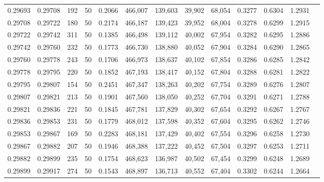 \begin{tabular}{rrrrrrrrrrrrr}
0.29693 & 0.29708 &   192 &  50 &                                     0.2066 & 466,007 & 139,603 &  39,902 &  68,054 & 0.3277 & 0.6304 & 1.2931 \\
0.29708 & 0.29722 &   180 &  50 &                                     0.2174 & 466,187 & 139,423 &  39,952 &  68,004 & 0.3278 & 0.6299 & 1.2915 \\
0.29722 & 0.29742 &   311 &  50 &                                     0.1385 & 466,498 & 139,112 &  40,002 &  67,954 & 0.3282 & 0.6295 & 1.2886 \\
0.29742 & 0.29760 &   232 &  50 &                                     0.1773 & 466,730 & 138,880 &  40,052 &  67,904 & 0.3284 & 0.6290 & 1.2865 \\
0.29760 & 0.29778 &   243 &  50 &                                     0.1706 & 466,973 & 138,637 &  40,102 &  67,854 & 0.3286 & 0.6285 & 1.2842 \\
0.29778 & 0.29795 &   220 &  50 &                                     0.1852 & 467,193 & 138,417 &  40,152 &  67,804 & 0.3288 & 0.6281 & 1.2822 \\
0.29795 & 0.29807 &   154 &  50 &                                     0.2451 & 467,347 & 138,263 &  40,202 &  67,754 & 0.3289 & 0.6276 & 1.2807 \\
0.29807 & 0.29821 &   213 &  50 &                                     0.1901 & 467,560 & 138,050 &  40,252 &  67,704 & 0.3291 & 0.6271 & 1.2788 \\
0.29821 & 0.29836 &   221 &  50 &                                     0.1845 & 467,781 & 137,829 &  40,302 &  67,654 & 0.3292 & 0.6267 & 1.2767 \\
0.29836 & 0.29853 &   231 &  50 &                                     0.1779 & 468,012 & 137,598 &  40,352 &  67,604 & 0.3295 & 0.6262 & 1.2746 \\
0.29853 & 0.29867 &   169 &  50 &                                     0.2283 & 468,181 & 137,429 &  40,402 &  67,554 & 0.3296 & 0.6258 & 1.2730 \\
0.29867 & 0.29882 &   207 &  50 &                                     0.1946 & 468,388 & 137,222 &  40,452 &  67,504 & 0.3297 & 0.6253 & 1.2711 \\
0.29882 & 0.29899 &   235 &  50 &                                     0.1754 & 468,623 & 136,987 &  40,502 &  67,454 & 0.3299 & 0.6248 & 1.2689 \\
0.29899 & 0.29917 &   274 &  50 &                                     0.1543 & 468,897 & 136,713 &  40,552 &  67,404 & 0.3302 & 0.6244 & 1.2664 \\

\end{tabular}
